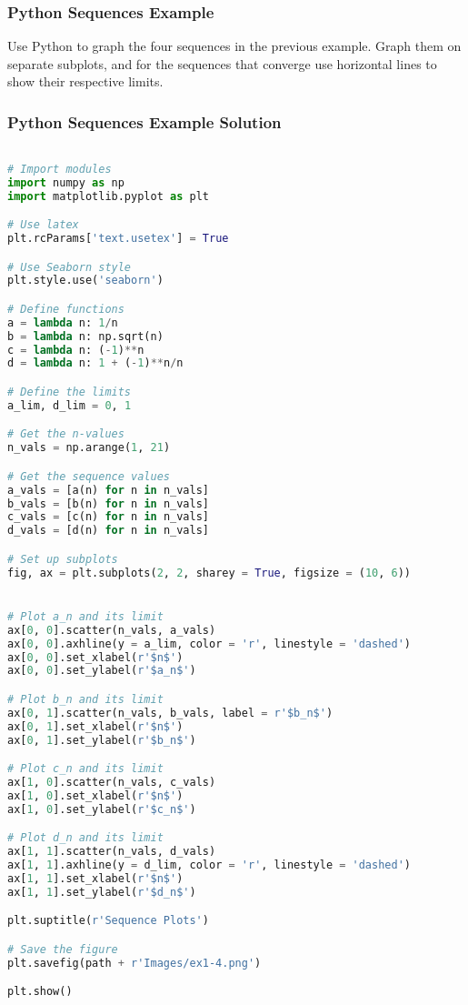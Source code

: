 \documentclass{beamer}
\begin{document}
\begin{frame}[fragile]
\frametitle{Python Sequences Example}
\begin{Example}
Use Python to graph the four sequences in the previous example. Graph them on separate subplots, and for the sequences that converge use horizontal lines to show their respective limits.
\end{Example}

\end{frame}

\begin{frame}[fragile]
\frametitle{Python Sequences Example Solution}
\begin{multicols}{2}
\begin{lstlisting}[language=Python]

# Import modules 
import numpy as np
import matplotlib.pyplot as plt

# Use latex
plt.rcParams['text.usetex'] = True

# Use Seaborn style
plt.style.use('seaborn')

# Define functions
a = lambda n: 1/n
b = lambda n: np.sqrt(n)
c = lambda n: (-1)**n
d = lambda n: 1 + (-1)**n/n

# Define the limits
a_lim, d_lim = 0, 1

# Get the n-values
n_vals = np.arange(1, 21)

# Get the sequence values
a_vals = [a(n) for n in n_vals]
b_vals = [b(n) for n in n_vals]
c_vals = [c(n) for n in n_vals]
d_vals = [d(n) for n in n_vals]

# Set up subplots
fig, ax = plt.subplots(2, 2, sharey = True, figsize = (10, 6))


# Plot a_n and its limit
ax[0, 0].scatter(n_vals, a_vals)
ax[0, 0].axhline(y = a_lim, color = 'r', linestyle = 'dashed')
ax[0, 0].set_xlabel(r'$n$')
ax[0, 0].set_ylabel(r'$a_n$')

# Plot b_n and its limit
ax[0, 1].scatter(n_vals, b_vals, label = r'$b_n$')
ax[0, 1].set_xlabel(r'$n$')
ax[0, 1].set_ylabel(r'$b_n$')

# Plot c_n and its limit
ax[1, 0].scatter(n_vals, c_vals)
ax[1, 0].set_xlabel(r'$n$')
ax[1, 0].set_ylabel(r'$c_n$')

# Plot d_n and its limit
ax[1, 1].scatter(n_vals, d_vals)
ax[1, 1].axhline(y = d_lim, color = 'r', linestyle = 'dashed')
ax[1, 1].set_xlabel(r'$n$')
ax[1, 1].set_ylabel(r'$d_n$')

plt.suptitle(r'Sequence Plots')

# Save the figure
plt.savefig(path + r'Images/ex1-4.png')

plt.show()
\end{lstlisting}
\end{multicols}
\end{frame}
\end{document}

